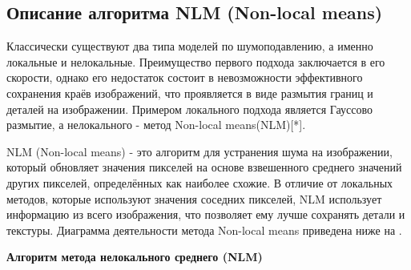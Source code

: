\subsection{Описание алгоритма NLM (Non-local means)}	
\par Классически существуют два типа моделей по шумоподавлению, а именно локальные и нелокальные. Преимущество первого подхода заключается в его скорости, однако его недостаток состоит в невозможности эффективного сохранения краёв изображений, что проявляется в виде размытия границ и деталей на изображении. Примером локального подхода является Гауссово размытие, а нелокального - метод Non-local means(NLM)[*].
\par NLM (Non-local means) - это алгоритм для устранения шума на изображении, который обновляет значения пикселей на основе взвешенного среднего значений других пикселей, определённых как наиболее схожие. В отличие от локальных методов, которые используют значения соседних пикселей, NLM использует информацию из всего изображения, что позволяет ему лучше сохранять детали и текстуры. Диаграмма деятельности метода Non-local means приведена ниже на  .
\par \textbf{Алгоритм метода нелокального среднего (NLM)}
